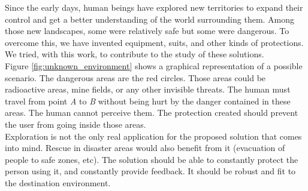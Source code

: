 \documentclass[oneside, a4paper, 12pt]{memoir}
\begin{document}
	Since the early days, human beings have explored new territories to expand their control and get a better understanding of the world surrounding them. Among those new landscapes, some were relatively safe but some were dangerous. To overcome this, we have invented equipment, suits, and other kinds of protections. We tried, with this work, to contribute to the study of these solutions.\\
	
	Figure \ref{fig:unknown_environment} shows a graphical representation of a possible scenario. The dangerous areas are the red circles. Those areas could be radioactive areas, mine fields, or any other invisible threats. The human must travel from point \emph{A} to \emph{B} without being hurt by the danger contained in these areas. The human cannot perceive them. The protection created should prevent the user from going inside those areas.\\
	
	Exploration is not the only real application for the proposed solution that comes into mind. Rescue in disaster areas would also benefit from it (evacuation of people to safe zones, etc). The solution should be able to constantly protect the person using it, and constantly provide feedback. It should be robust and fit to the destination environment.
	
%			
%			
%			
	
\end{document}
